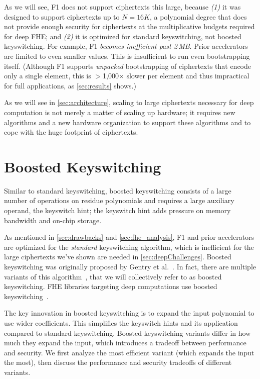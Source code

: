 \figBootstrappingFrequency

As we will see, F1 does not support ciphertexts this large, because \emph{(1)}
it was designed to support ciphertexts up to $N=16K$, a polynomial degree that
does not provide enough security for ciphertexts at the multiplicative budgets
required for deep FHE; and \emph{(2)} it is optimized for standard
keyswitching, not boosted keyswitching. For example, F1 \emph{becomes
inefficient past 2\,MB}. Prior accelerators~\cite{riazi:asplos20:heax} are
limited to even smaller values. This is insufficient to run even bootstrapping
itself. (Although F1 supports \emph{unpacked} bootstrapping of ciphertexts that
encode only a single element, this is $>$1,000$\times$ slower per element and
thus impractical for full applications, as \autoref{sec:results} shows.)

As we will see in \autoref{sec:architecture}, scaling to large ciphertexts
necessary for deep computation is not merely a matter of scaling up hardware;
it requires new algorithms and a new hardware organization to support these
algorithms and to cope with the huge footprint of ciphertexts.

\section{Boosted Keyswitching}
\label{sec:boostedKeyswitching}

Similar to standard keyswitching, boosted keyswitching consists of a large
number of operations on residue polynomials and requires a large auxiliary
operand, the keyswitch hint; the keyswitch hint adds pressure on memory
bandwidth and on-chip storage.

\figKScompare

As mentioned in \autoref{sec:drawbacks} and \autoref{sec:fhe_analysis}, F1 and
prior accelerators are optimized for the \emph{standard} keyswitching
algorithm, which is inefficient for the large ciphertexts we've shown are
needed in \autoref{sec:deepChallenges}. Boosted keyswitching was originally
proposed by Gentry et al.~\cite[Section 3.1]{gentry:crypto2012:homomorphic}. In
fact, there are multiple variants of this algorithm~\cite[Section
5.3.4]{halevi2020helib}, that we will collectively refer to as boosted
keyswitching. FHE libraries targeting deep computations use boosted
keyswitching~\cite{gentry:crypto2012:homomorphic,halevi2020helib,heaan,mouchet2020lattigo}.

The key innovation in boosted keyswitching is to expand the input polynomial to
use wider coefficients. This simplifies the keyswitch hints and its application
compared to standard keyswitching. Boosted keyswitching variants differ in how
much they expand the input, which introduces a tradeoff between performance and
security. We first analyze the most efficient variant (which expands the input
the most), then discuss the performance and security tradeoffs of different
variants.

